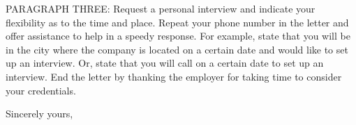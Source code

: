 \documentclass{letter} %
\begin{document}
\begin{letter}
\noindent PARAGRAPH THREE: Request a personal interview and  indicate  your 
flexibility as to the time and place. Repeat your phone number in 
the letter and offer assistance to help in a speedy response. For 
example,  state that you will be in the city where the company is 
located on a certain date and would like to set up an  interview. 
Or,  state  that  you  will  call  on a certain date to set up an 
interview. End the letter by thanking  the  employer  for  taking 
time to consider your credentials. 
 
\closing{Sincerely yours,} 

\encl{}

\end{letter}
\end{document}
